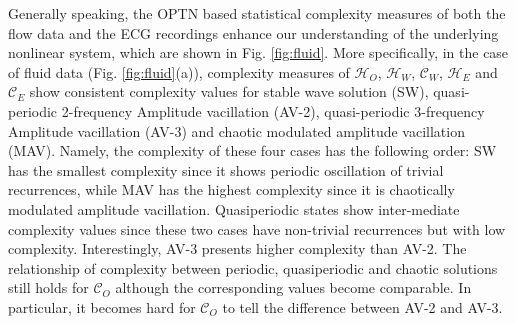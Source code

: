 \documentclass[12pt,aip,cha,reprint,nofootinbib]{revtex4-1}
\begin{document}
Generally speaking, the OPTN based statistical complexity measures of both the flow data and the ECG recordings enhance our understanding of the underlying nonlinear system, which are shown in Fig. \ref{fig:fluid}. More specifically, in the case of fluid data (Fig. \ref{fig:fluid}(a)), complexity measures of $\mathcal{H}_O$, $\mathcal{H}_W$, $\mathcal{C}_W$, $\mathcal{H}_E$ and $\mathcal{C}_E$ show consistent complexity values for stable wave solution (SW), quasi-periodic 2-frequency Amplitude vacillation (AV-2), quasi-periodic 3-frequency Amplitude vacillation (AV-3) and chaotic modulated amplitude vacillation (MAV). Namely, the complexity of these four cases has the following order: SW has the smallest complexity since it shows periodic oscillation of trivial recurrences, while MAV has the highest complexity since it is chaotically modulated amplitude vacillation. Quasiperiodic states show inter-mediate complexity values since these two cases have non-trivial recurrences but with low complexity. Interestingly, AV-3 presents higher complexity than AV-2. The relationship of complexity between periodic, quasiperiodic and chaotic solutions still holds for $\mathcal{C}_O$ although the corresponding values become comparable. In particular, it becomes hard for $\mathcal{C}_O$ to tell the difference between AV-2 and AV-3. 
\end{document}
